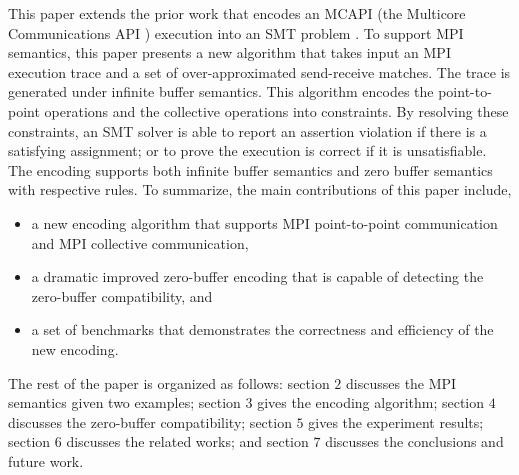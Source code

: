 This paper extends the prior work that encodes an MCAPI (the Multicore Communications API \cite{mcapi}) execution into an SMT problem \cite{DBLP:conf/kbse/HuangMM13}. To support MPI semantics, this paper presents a new algorithm that takes input an MPI execution trace and a set of over-approximated send-receive matches. The trace is generated under infinite buffer semantics. This algorithm encodes the point-to-point operations and the collective operations into constraints. By resolving these constraints, an SMT solver is able to report an assertion violation if there is a satisfying assignment; or to prove the execution is correct if it is unsatisfiable. The encoding supports both infinite buffer semantics and zero buffer semantics with respective rules. To summarize, the main contributions of this paper include,
\begin{itemize}
\item a new encoding algorithm that supports MPI point-to-point communication and MPI collective communication,
\item a dramatic improved zero-buffer encoding that is capable of detecting the zero-buffer compatibility, and
\item a set of benchmarks that demonstrates the correctness and efficiency of the new encoding.
\end{itemize}

The rest of the paper is organized as follows: section $2$ discusses the MPI semantics given two examples; section $3$ gives the encoding algorithm; section $4$ discusses the zero-buffer compatibility; section $5$ gives the experiment results; section $6$ discusses the related works; and section $7$ discusses the conclusions and future work.

\examplefigone


           